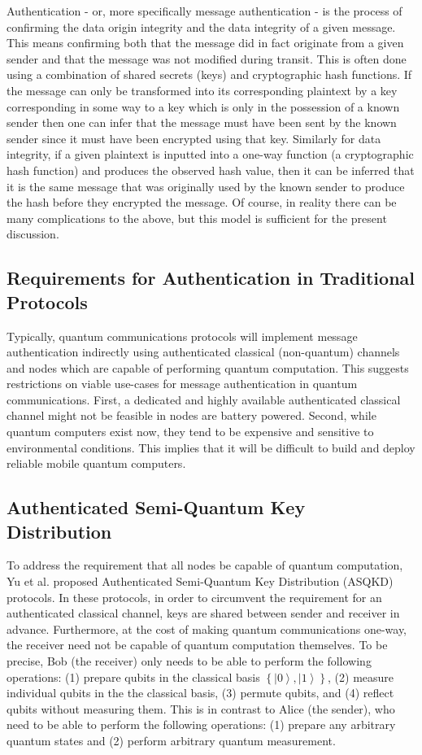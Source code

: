 \documentclass[conference]{IEEEtran}
\begin{document}
Authentication - or, more specifically message authentication - is
the process of confirming the data origin integrity and the data integrity
of a given message. This means confirming both that the message did
in fact originate from a given sender and that the message was not
modified during transit. This is often done using a combination of
shared secrets (keys) and cryptographic hash functions. If the message
can only be transformed into its corresponding plaintext by a key
corresponding in some way to a key which is only in the possession
of a known sender then one can infer that the message must have been
sent by the known sender since it must have been encrypted using that
key. Similarly for data integrity, if a given plaintext is inputted
into a one-way function (a cryptographic hash function) and produces
the observed hash value, then it can be inferred that it is the same
message that was originally used by the known sender to produce the
hash before they encrypted the message. Of course, in reality there
can be many complications to the above, but this model is sufficient
for the present discussion.

\subsection{Requirements for Authentication in Traditional Protocols}

Typically, quantum communications protocols will implement message
authentication indirectly using authenticated classical (non-quantum)
channels and nodes which are capable of performing quantum computation.
This suggests restrictions on viable use-cases for message authentication
in quantum communications. First, a dedicated and highly available
authenticated classical channel might not be feasible in nodes are
battery powered. Second, while quantum computers exist now, they tend
to be expensive and sensitive to environmental conditions. This implies
that it will be difficult to build and deploy reliable mobile quantum
computers.

\subsection{Authenticated Semi-Quantum Key Distribution}

To address the requirement that all nodes be capable of quantum computation,
Yu et al. proposed Authenticated Semi-Quantum Key Distribution (ASQKD)
protocols. In these protocols, in order to circumvent the requirement
for an authenticated classical channel, keys are shared between sender
and receiver in advance. Furthermore, at the cost of making quantum
communications one-way, the receiver need not be capable of quantum
computation themselves. To be precise, Bob (the receiver) only needs
to be able to perform the following operations: (1) prepare qubits
in the classical basis $\left\{ \left|0\right\rangle ,\left|1\right\rangle \right\} $,
(2) measure individual qubits in the the classical basis, (3) permute
qubits, and (4) reflect qubits without measuring them. This is in
contrast to Alice (the sender), who need to be able to perform the
following operations: (1) prepare any arbitrary quantum states and
(2) perform arbitrary quantum measurement.
\end{document}

